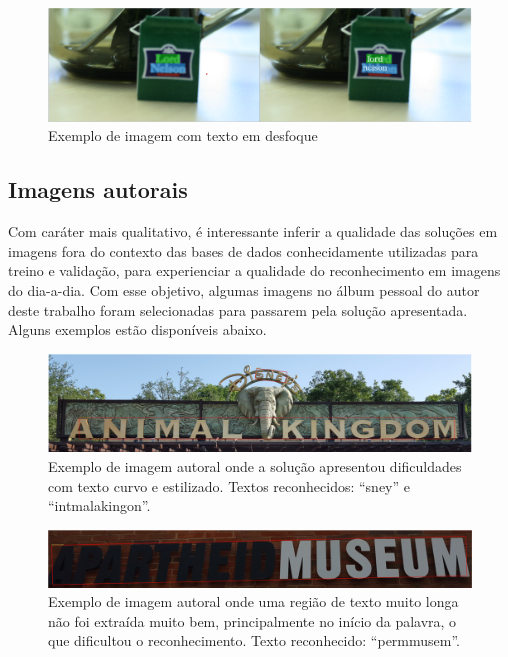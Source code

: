 \begin{figure}
    \centering
    \includegraphics[width=\textwidth]{figs/resultados-icdar13-04.png}
    \caption{Exemplo de imagem com texto em desfoque}
    \label{fig:results_icdar13_04}
\end{figure}


\subsection{Imagens autorais}\label{sec:results_own_images}
Com caráter mais qualitativo, é interessante inferir a qualidade das soluções em imagens fora do contexto das bases de dados conhecidamente utilizadas para treino e validação, para experienciar a qualidade do reconhecimento em imagens do dia-a-dia. Com esse objetivo, algumas imagens no álbum pessoal do autor deste trabalho foram selecionadas para passarem pela solução apresentada. Alguns exemplos estão disponíveis abaixo.

\begin{figure}
    \centering
    \includegraphics[width=\textwidth]{figs/resultados-autoral-01.png}
    \caption{Exemplo de imagem autoral onde a solução apresentou dificuldades com texto curvo e estilizado. Textos reconhecidos: “sney” e “intmalakingon”.}
    \label{fig:results_own_images_01}
\end{figure}

\begin{figure}
    \centering
    \includegraphics[width=\textwidth]{figs/resultados-autoral-02.png}
    \caption{Exemplo de imagem autoral onde uma região de texto muito longa não foi extraída muito bem, principalmente no início da palavra, o que dificultou o reconhecimento. Texto reconhecido: “permmusem”.}
    \label{fig:results_own_images_02}
\end{figure}

